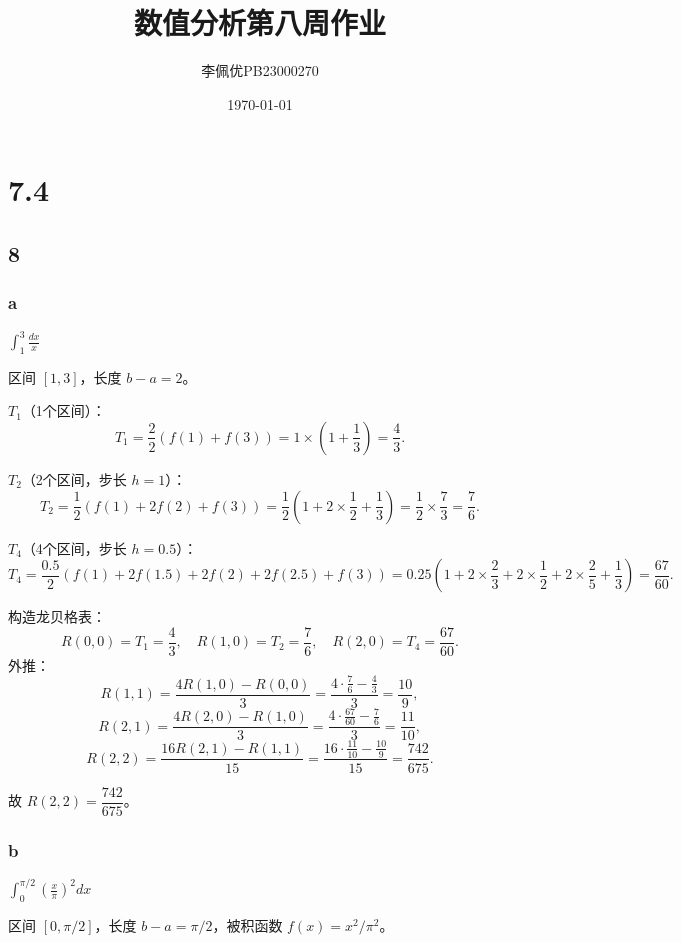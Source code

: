 \documentclass{article}
\title{数值分析第八周作业}
\date{\today}
\author{李佩优PB23000270}
\begin{document}
\maketitle

\section*{7.4}
\subsection*{8}


\subsubsection*{a}  
\(\displaystyle \int_{1}^{3} \frac{dx}{x}\)

区间 \([1,3]\)，长度 \(b-a=2\)。

\(T_1\)（1个区间）：
  \[
  T_1 = \frac{2}{2}\left(f(1)+f(3)\right) = 1\times\left(1+\frac{1}{3}\right) = \frac{4}{3}.
  \]

\(T_2\)（2个区间，步长 \(h=1\)）：
  \[
  T_2 = \frac{1}{2}\left(f(1)+2f(2)+f(3)\right) = \frac{1}{2}\left(1+2\times\frac{1}{2}+\frac{1}{3}\right) = \frac{1}{2}\times\frac{7}{3} = \frac{7}{6}.
  \]

\(T_4\)（4个区间，步长 \(h=0.5\)）：
  \[
  T_4 = \frac{0.5}{2}\left(f(1)+2f(1.5)+2f(2)+2f(2.5)+f(3)\right) = 0.25\left(1+2\times\frac{2}{3}+2\times\frac{1}{2}+2\times\frac{2}{5}+\frac{1}{3}\right) = \frac{67}{60}.
  \]

构造龙贝格表：
\[
R(0,0)=T_1=\frac{4}{3},\quad R(1,0)=T_2=\frac{7}{6},\quad R(2,0)=T_4=\frac{67}{60}.
\]
外推：
\[
R(1,1)=\frac{4R(1,0)-R(0,0)}{3}=\frac{4\cdot\frac{7}{6}-\frac{4}{3}}{3}=\frac{10}{9},
\]
\[
R(2,1)=\frac{4R(2,0)-R(1,0)}{3}=\frac{4\cdot\frac{67}{60}-\frac{7}{6}}{3}=\frac{11}{10},
\]
\[
R(2,2)=\frac{16R(2,1)-R(1,1)}{15}=\frac{16\cdot\frac{11}{10}-\frac{10}{9}}{15}=\frac{742}{675}.
\]

故 \(R(2,2)=\dfrac{742}{675}\)。

\subsubsection*{b}  
\(\displaystyle \int_{0}^{\pi/2} \left(\frac{x}{\pi}\right)^2 dx\)

区间 \([0,\pi/2]\)，长度 \(b-a=\pi/2\)，被积函数 \(f(x)=x^2/\pi^2\)。
\end{document}
